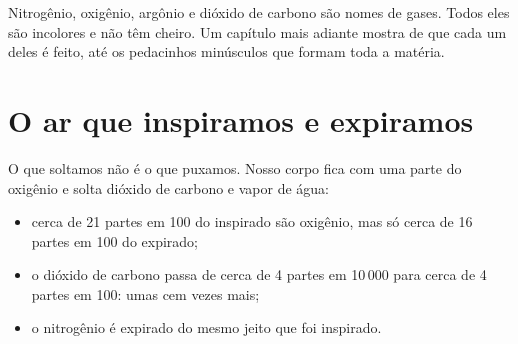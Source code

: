 \begin{remark}\label{rem:g4:air-a-mixture-of-gases:names}
Nitrogênio, oxigênio, argônio e dióxido de carbono são nomes de gases.
Todos eles são incolores e não têm cheiro. Um capítulo mais adiante
mostra de que cada um deles é feito, até os pedacinhos minúsculos que
formam toda a matéria.
\end{remark}

\section{O ar que inspiramos e expiramos}

\begin{proposition}[O ar expirado]\label{prop:g4:air-a-mixture-of-gases:breath}
O  que soltamos não é o  que puxamos. Nosso corpo fica com uma
parte do oxigênio e solta dióxido de carbono e vapor de água:
\begin{itemize}
  \item cerca de 21 partes em 100 do  inspirado são oxigênio, mas só
        cerca de 16 partes em 100 do  expirado;
  \item o dióxido de carbono passa de cerca de 4 partes em 10\,000 para
        cerca de 4 partes em 100: umas cem vezes mais;
  \item o nitrogênio é expirado do mesmo jeito que foi inspirado.
\end{itemize}
\end{proposition}

